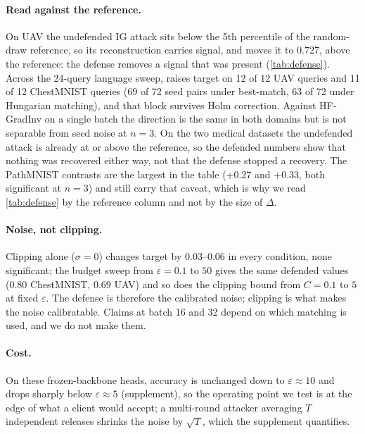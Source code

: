 \paragraph{Read against the reference.}
On UAV the undefended IG attack sits below the 5th percentile of the random-draw reference, so its reconstruction carries signal, and \nbfu moves it to 0.727, above the reference: the defense removes a signal that was present (\cref{tab:defense}).
Across the 24-query language sweep, \nbfu raises target \lpips on 12 of 12 UAV queries and 11 of 12 ChestMNIST queries (69 of 72 seed pairs under best-match, 63 of 72 under Hungarian matching), and that block survives Holm correction.
Against HF-GradInv on a single batch the direction is the same in both domains but is not separable from seed noise at $n=3$.
On the two medical datasets the undefended attack is already at or above the reference, so the defended numbers show that nothing was recovered either way, not that the defense stopped a recovery. The PathMNIST contrasts are the largest in the table (+0.27 and +0.33, both significant at $n=3$) and still carry that caveat, which is why we read \cref{tab:defense} by the reference column and not by the size of $\Delta$.

\paragraph{Noise, not clipping.}
Clipping alone ($\sigma=0$) changes target \lpips by 0.03--0.06 in every condition, none significant; the budget sweep from $\varepsilon=0.1$ to $50$ gives the same defended values (0.80 ChestMNIST, 0.69 UAV) and so does the clipping bound from $C=0.1$ to $5$ at fixed $\varepsilon$.
The defense is therefore the calibrated noise; clipping is what makes the noise calibratable.
Claims at batch 16 and 32 depend on which matching is used, and we do not make them.

\paragraph{Cost.}
On these frozen-backbone heads, accuracy is unchanged down to $\varepsilon\approx10$ and drops sharply below $\varepsilon\approx5$ (supplement), so the operating point we test is at the edge of what a client would accept; a multi-round attacker averaging $T$ independent releases shrinks the noise by $\sqrt{T}$, which the supplement quantifies.
